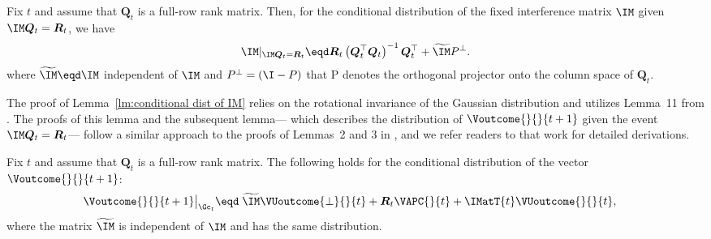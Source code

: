 \begin{lemma}
    \label{lm:conditional dist of IM}
    Fix $t$ and assume that $\bm{Q}_t$ is a full-row rank matrix. Then, for the conditional distribution of the fixed interference matrix $\IM$ given $\IM \bm{Q}_t=\bm{R}_t$, we have
        \begin{align}
        \label{eq:conditional dist of IM}
        \IM|_{\IM \bm{Q}_t=\bm{R}_t}
        \eqd
        \bm{R}_t
        \left(
        \bm{Q}_t^\top \bm{Q}_t
        \right)^{-1}
        \bm{Q}_t^\top
        +
        \widetilde{\IM} P^\perp.
        \end{align}
    where $\widetilde{\IM} \eqd \IM$ independent of $\IM$ and $P^\perp = (\I-P)$ that P denotes the orthogonal projector onto the column space of $\bm{Q}_t$.
\end{lemma}

The proof of Lemma~\ref{lm:conditional dist of IM} relies on the rotational invariance of the Gaussian distribution and utilizes Lemma~11 from \cite{bayati2011dynamics}. The proofs of this lemma and the subsequent lemma— which describes the distribution of $\Voutcome{}{}{t+1}$ given the event $\IM \bm{Q}_t = \bm{R}_t$— follow a similar approach to the proofs of Lemmas~2 and 3 in \cite{shirani2024causal}, and we refer readers to that work for detailed derivations.

 
\begin{lemma}
    \label{lm:conditional dist of outcome}
    Fix $t$ and assume that $\bm{Q}_t$ is a full-row rank matrix. The following holds for the conditional distribution of the vector $\Voutcome{}{}{t+1}$:
            \begin{align}
                \label{eq:conditional dist of outcome_nonsym}
                \Voutcome{}{}{t+1}\big|_{\Gc_t}
                \eqd
                &\;
                \widetilde{\IM} 
                \VUoutcome{\perp}{}{t}
                + \bm{R}_t \VAPC{}{t} + \IMatT{t} \VUoutcome{}{}{t},
            \end{align}
    where the matrix $\widetilde{\IM}$ is independent of $\IM$ and has the same distribution.
\end{lemma}

